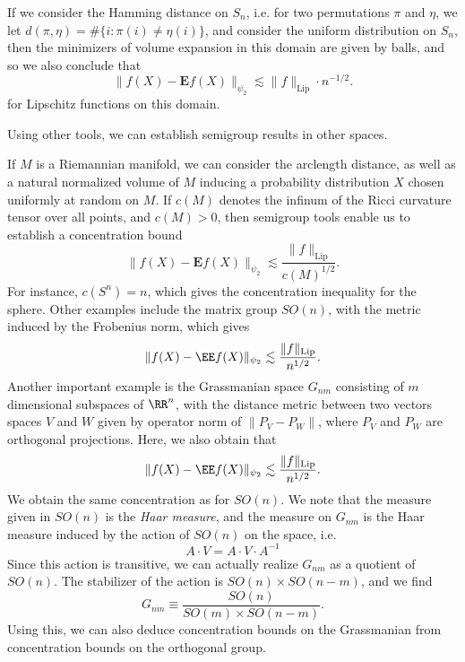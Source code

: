 \begin{example}
	If we consider the Hamming distance on $S_n$, i.e. for two permutations $\pi$ and $\eta$, we let $d(\pi,\eta) = \# \{ i: \pi(i) \neq \eta(i) \}$, and consider the uniform distribution on $S_n$, then the minimizers of volume expansion in this domain are given by balls, and so we also conclude that
    \[ \| f(X) - \mathbf{E} f(X) \|_{\psi_2} \lesssim \| f \|_{\text{Lip}} \cdot n^{-1/2}. \]
    for Lipschitz functions on this domain.
\end{example}

Using other tools, we can establish semigroup results in other spaces.

\begin{example}
    If $M$ is a Riemannian manifold, we can consider the arclength distance, as well as a natural normalized volume of $M$ inducing a probability distribution $X$ chosen uniformly at random on $M$. If $c(M)$ denotes the infinum of the Ricci curvature tensor over all points, and $c(M) > 0$, then semigroup tools enable us to establish a concentration bound
    \[ \| f(X) - \mathbf{E} f(X) \|_{\psi_2} \lesssim \frac{\| f \|_{\text{Lip}}}{c(M)^{1/2}}. \]
    For instance, $c(S^n) = n$, which gives the concentration inequality for the sphere. Other examples include the matrix group $SO(n)$, with the metric induced by the Frobenius norm, which gives
    \[ \| f(X) - \EE f(X) \|_{\psi_2} \lesssim \frac{\| f \|_{\text{Lip}}}{n^{1/2}}. \]
    Another important example is the Grassmanian space $G_{nm}$ consisting of $m$ dimensional subspaces of $\RR^n$, with the distance metric between two vectors spaces $V$ and $W$ given by operator norm of $\| P_V - P_W \|$, where $P_V$ and $P_W$ are orthogonal projections. Here, we also obtain that
    \[ \| f(X) - \EE f(X) \|_{\psi_2} \lesssim \frac{\| f \|_{\text{Lip}}}{n^{1/2}}. \]
    We obtain the same concentration as for $SO(n)$. We note that the measure given in $SO(n)$ is the \emph{Haar measure}, and the measure on $G_{nm}$ is the Haar measure induced by the action of $SO(n)$ on the space, i.e.
    \[ A \cdot V = A \cdot V \cdot A^{-1} \]
    Since this action is transitive, we can actually realize $G_{nm}$ as a quotient of $SO(n)$. The stabilizer of the action is $SO(n) \times SO(n-m)$, and we find
    \[ G_{nm} \equiv \frac{SO(n)}{SO(m) \times SO(n-m)}. \]
    Using this, we can also deduce concentration bounds on the Grassmanian from concentration bounds on the orthogonal group.
\end{example}

